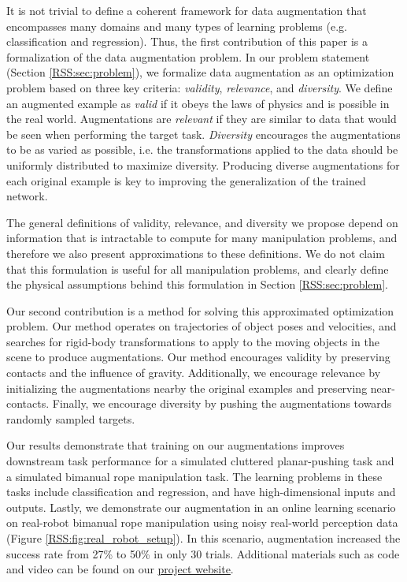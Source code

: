 It is not trivial to define a coherent framework for data augmentation that encompasses many domains and many types of learning problems (e.g. classification and regression). Thus, the first contribution of this paper is a formalization of the data augmentation problem. In our problem statement (Section \ref{RSS:sec:problem}), we formalize data augmentation as an optimization problem based on three key criteria: \textit{validity}, \textit{relevance}, and \textit{diversity}. We define an augmented example as \textit{valid} if it obeys the laws of physics and is possible in the real world. Augmentations are \textit{relevant} if they are similar to data that would be seen when performing the target task. \textit{Diversity} encourages the augmentations to be as varied as possible, i.e. the transformations applied to the data should be uniformly distributed to maximize diversity. Producing diverse augmentations for each original example is key to improving the generalization of the trained network.

The general definitions of validity, relevance, and diversity we propose depend on information that is intractable to compute for many manipulation problems, and therefore we also present approximations to these definitions. We do not claim that this formulation is useful for all manipulation problems, and clearly define the physical assumptions behind this formulation in Section \ref{RSS:sec:problem}.

Our second contribution is a method for solving this approximated optimization problem. Our method operates on trajectories of object poses and velocities, and searches for rigid-body transformations to apply to the moving objects in the scene to produce augmentations. Our method encourages validity by preserving contacts and the influence of gravity. Additionally, we encourage relevance by initializing the augmentations nearby the original examples and preserving near-contacts. Finally, we encourage diversity by pushing the augmentations towards randomly sampled targets.

Our results demonstrate that training on our augmentations improves downstream task performance for a simulated cluttered planar-pushing task and a simulated bimanual rope manipulation task. The learning problems in these tasks include classification and regression, and have high-dimensional inputs and outputs. Lastly, we demonstrate our augmentation in an online learning scenario on real-robot bimanual rope manipulation using noisy real-world perception data (Figure \ref{RSS:fig:real_robot_setup}). In this scenario, augmentation increased the success rate from 27\% to 50\% in only 30 trials. Additional materials such as code and video can be found on our \href{https://sites.google.com/view/data-augmentation4manipulation}{project website}.
